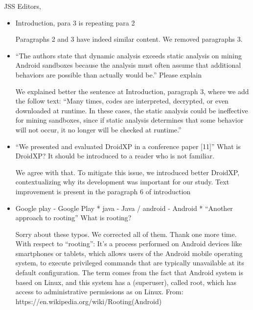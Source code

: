 \documentclass{letter}
\begin{document}
\begin{letter}{JSS Editors,}
\begin{itemize}
\item Introduction, para 3 is repeating para 2


\vspace{0.2cm}

{\color{blue}{\bf Answer:} Paragraphs 2 and 3 have indeed similar content. We removed paragraphs 3.}

\vspace{0.2cm}

\item ``The authors state that dynamic analysis exceeds static analysis on mining Android sandboxes because the
analysis must often assume that additional behaviors are possible than actually would be.''
Please explain


\vspace{0.2cm}

{\color{blue}{\bf Answer:} We explained better the sentence at Introduction, paragraph 3, where we add the follow text: ``Many times, codes are interpreted, decrypted, or even downloaded at runtime. In these cases, the static analysis could be ineffective for mining sandboxes, since if static analysis determines that some behavior will not occur, it no longer will be checked at runtime.''}

\vspace{0.2cm}

\item ``We presented and evaluated DroidXP in a conference paper [11]''
What is DroidXP? It should be introduced to a reader who is not familiar.


\vspace{0.2cm}

{\color{blue}{\bf Answer:} We agree with that. To mitigate this issue, we introduced better DroidXP, contextualizing why its development was important for our study. Text improvement is present in the paragraph 6 of introduction}

\vspace{0.2cm}

\item Google play - Google Play
* java - Java / android - Android
* ``Another approach to rooting''
What is rooting?


\vspace{0.2cm}

{\color{blue}{\bf Answer:} Sorry about these typos. We corrected all of them. Thank one more time. With respect to ``rooting'': It's a process performed on Android devices like smartphones or tablets, which allows users of the Android mobile operating system, to execute privileged commands that are typically unavailable at its default configuration. The term comes from the fact that Android system is based on Linux, and this system has a (superuser), called root, which has access to administrative permissions as on Linux.\newline
From: https://en.wikipedia.org/wiki/Rooting(Android)
}


\end{itemize}
\end{letter}
\end{document}
